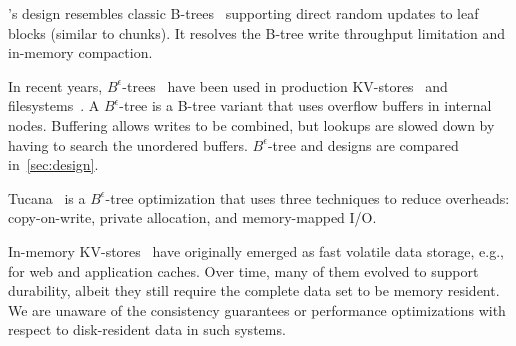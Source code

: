 \sys's design resembles classic B-trees~\cite{Knuth:1998:ACP:280635} supporting direct random updates to leaf blocks (similar to chunks). 
It resolves the B-tree write throughput limitation  and in-memory compaction. 


In  recent years, $B^{\epsilon}$-trees~\cite{Brodal:2003:LBE:644108.644201} have been used in production KV-stores~\cite{TokuDB} and filesystems~\cite{BetrFS}. 
A $B^{\epsilon}$-tree is a B-tree variant that uses overflow buffers in internal nodes.
Buffering allows writes to be combined, but lookups are slowed down by having to search the unordered buffers.
$B^{\epsilon}$-tree and \sys\/ designs are compared in~\cref{sec:design}.

Tucana~\cite{tucana} is a $B^{\epsilon}$-tree optimization that uses three techniques to reduce overheads: copy-on-write, 
private allocation, and memory-mapped I/O.

In-memory KV-stores~\cite{ignite, redis, memcached, Srinivasan:2016:AAR:3007263.3007276} have originally emerged as fast volatile 
data storage, e.g., for web and application caches. Over time, many of them evolved to support durability,
albeit they still require the complete data set to be memory resident.
We are unaware of the consistency guarantees or performance optimizations with respect  to disk-resident data in such systems. 

